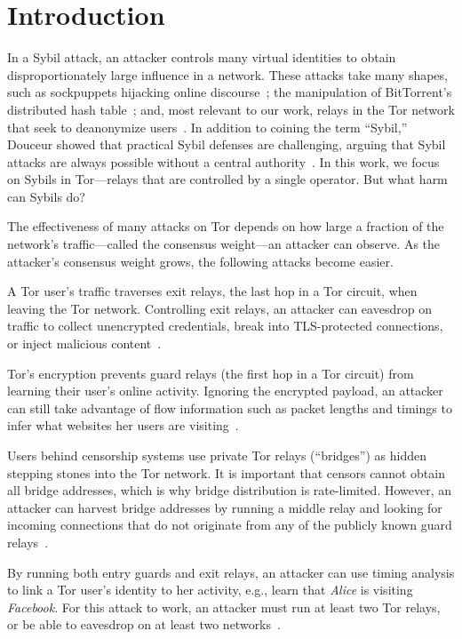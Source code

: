\section{Introduction}
\label{sec:introduction}
In a Sybil attack, an attacker controls many virtual identities to obtain
disproportionately large influence in a network.  These attacks take many
shapes, such as sockpuppets hijacking online discourse~\cite{Thomas2012a}; the
manipulation of BitTorrent's distributed hash table~\cite{Wang2012a}; and, most
relevant to our work, relays in the Tor network that seek to deanonymize
users~\cite{cmucert}.  In addition to coining the term ``Sybil,'' Douceur showed
that practical Sybil defenses are challenging, arguing that Sybil attacks are
always possible without a central authority~\cite{Douceur2002a}.  In this work,
we focus on Sybils in Tor---relays that are controlled by a single operator.
But what harm can Sybils do?

The effectiveness of many attacks on Tor depends on how large a fraction of the
network's traffic---called the consensus weight---an attacker can observe.  As
the attacker's consensus weight grows, the following attacks become easier.

\begin{description}[noitemsep]
	\item[Exit traffic tampering:] A Tor user's traffic traverses exit relays,
		the last hop in a Tor circuit, when leaving the Tor network.
		Controlling exit relays, an attacker can eavesdrop on traffic to
		collect unencrypted credentials, break into TLS-protected connections,
		or inject malicious content~\cite{Winter2014a}.
	\item[Website fingerprinting:] Tor's encryption prevents guard relays (the
		first hop in a Tor circuit) from learning their user's online activity.
		Ignoring the encrypted payload, an attacker can still take advantage of
		flow information such as packet lengths and timings to infer what
		websites her users are visiting~\cite{Juarez2014a}.
	\item[Bridge address harvesting:] Users behind censorship systems use
		private Tor relays (``bridges'') as hidden stepping stones into the Tor
		network.  It is important that censors cannot obtain all bridge
		addresses, which is why bridge distribution is rate-limited.  However,
		an attacker can harvest bridge addresses by running a middle relay and
		looking for incoming connections that do not originate from any of the
		publicly known guard relays~\cite{Ling2015b}.
	\item[End-to-end correlation:] By running both entry guards and exit relays,
		an attacker can use timing analysis to link a Tor user's identity to her
		activity, e.g., learn that \emph{Alice} is visiting \emph{Facebook}.
		For this attack to work, an attacker must run at least two Tor relays,
		or be able to eavesdrop on at least two networks~\cite{Johnson2013a}.
\end{description}

